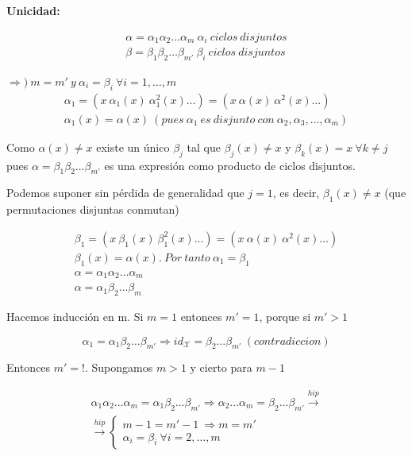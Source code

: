 \documentclass{article}
\begin{document}
\textbf{Unicidad:}

\begin{gather*}
\alpha=\alpha_1\alpha_2\ldots\alpha_m~\alpha_i~ciclos~disjuntos \\
\beta=\beta_1\beta_2\ldots\beta_{m'}~\beta_i~ciclos~disjuntos
\end{gather*}

$\Rightarrow)~m=m'~y~\alpha_i=\beta_i~\forall i=1,\ldots,m$ \\

\begin{gather*}
\alpha_1=(x~\alpha_1(x)~\alpha_1^2(x)\ldots)=(x~\alpha(x)~\alpha^2(x) \ldots) \\
\alpha_1(x)=\alpha(x)~(pues~\alpha_1~es~disjunto~con~\alpha_2,\alpha_3,\ldots,\alpha_m)
\end{gather*}

Como $\alpha(x)\neq x$ existe un único $\beta_j$ tal que $\beta_j(x)\neq x$ y $\beta_k(x)=x~\forall k \neq j$ pues $\alpha=\beta_1\beta_2 \ldots \beta_{m'}$ es una expresión como producto de ciclos disjuntos.

Podemos suponer sin pérdida de generalidad que $j=1$, es decir, $\beta_1(x)\neq x$ (que permutaciones disjuntas conmutan)

\begin{gather*}
\beta_1=(x~\beta_1(x)~\beta_1^2(x)\ldots)=(x~\alpha(x)~\alpha^2(x)\ldots) \\
\beta_1(x)=\alpha(x).~Por~tanto~\alpha_1=\beta_1 \\
\alpha=\alpha_1\alpha_2\ldots\alpha_m \\
\alpha=\alpha_1\beta_2\ldots\beta_m
\end{gather*}

Hacemos inducción en m. Si $m=1$ entonces $m'=1$, porque si $m'>1$

\begin{equation*}
\alpha_1=\alpha_1\beta_2\ldots\beta_{m'} \Rightarrow id_\mathcal{X}=\beta_2\ldots\beta_{m'}~(contradiccion)
\end{equation*}

Entonces $m'=!$. Supongamos $m>1$ y cierto para $m-1$

\begin{gather*}
\alpha_1\alpha_2\ldots\alpha_m=\alpha_1\beta_2\ldots\beta_{m'} \Rightarrow
\alpha_2\ldots\alpha_m=\beta_2\ldots\beta_{m'} \xrightarrow{hip} \\
\xrightarrow{hip} \left\lbrace \begin{array}{c}
m-1=m'-1~\Rightarrow m=m' \\
\alpha_i=\beta_i~\forall i=2,\ldots,m
\end{array}\right.
\end{gather*}
\end{document}

